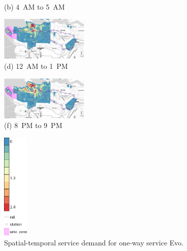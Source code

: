 \begin{figure}[hhh!!]
\begin{minipage}[b]{0.3\linewidth}
\begin{minipage}[b]{\linewidth}
           {\\(b) 4~AM to 5~AM}
         \end{minipage}
         \begin{minipage}[b]{\linewidth}
           \centering
           \hspace*{-0.1cm}
           \includegraphics[width=42mm]{evo_heatmaps/min/hora12.pdf}
           {\\(d) 12~AM to 1~PM}
         \end{minipage}
         \begin{minipage}[b]{\linewidth}
           \hspace*{-0.1cm}
           \centering
           \includegraphics[width=42mm]{evo_heatmaps/min/hora20.pdf}
           {\\(f) 8~PM to 9~PM}
         \end{minipage}
   \end{minipage}
   \begin{minipage}[b]{0.1\linewidth}
   \centering
   		 \hspace*{12mm}
   		 \includegraphics[width=12mm]{evo_heatmaps/legenda_evo.pdf}
         \vspace{17mm}
   \end{minipage}
   \caption{Spatial-temporal service demand for one-way service Evo.}
   \label{fig:4_4_heat_evo}
\end{figure}

